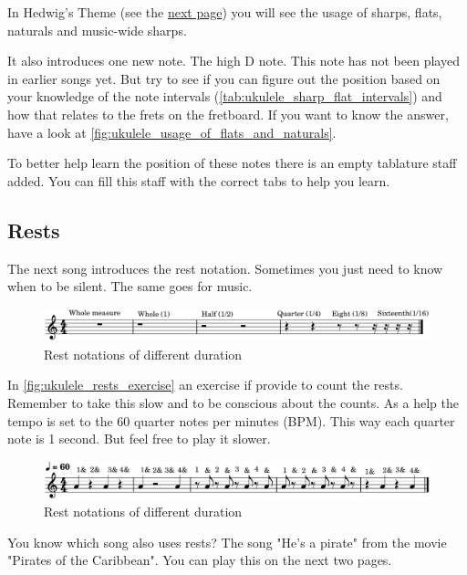 In Hedwig's Theme (see the \hyperlink{UkuleleHarrysPotterHedwigsTheme.pdf.1}{next page}) you will see the usage of sharps, flats, naturals and music-wide sharps.

It also introduces one new note. The high D note. This note has not been played in earlier songs yet. But try to see if you can figure out the position based on your knowledge of the note intervals (\autoref{tab:ukulele_sharp_flat_intervals}) and how that relates to the frets on the fretboard. If you want to know the answer, have a look at \autoref{fig:ukulele_usage_of_flats_and_naturals}.

To better help learn the position of these notes there is an empty tablature staff added. You can fill this staff with the correct tabs to help you learn.



\newpage

\subsection{Rests}

The next song introduces the rest notation. Sometimes you just need to know when to be silent. The same goes for music.

\begin{figure}[h]
	\centering
	\includegraphics[width=\textwidth]{../../MuseScore/Ukulele/UkuleleRests.png}
	\caption{Rest notations of different duration}
	\label{fig:ukulele_rests}
\end{figure}

In \autoref{fig:ukulele_rests_exercise} an exercise if provide to count the rests. Remember to take this slow and to be conscious about the counts. As a help the tempo is set to the 60 quarter notes per minutes (BPM). This way each quarter note is 1 second. But feel free to play it slower.

\begin{figure}[h]
	\centering
	\includegraphics[width=\textwidth]{../../MuseScore/Ukulele/UkuleleRestsExercise.png}
	\caption{Rest notations of different duration}
	\label{fig:ukulele_rests_exercise}
\end{figure}

You know which song also uses rests? The song "He's a pirate" from the movie "Pirates of the Caribbean". You can play this on the next two pages.



